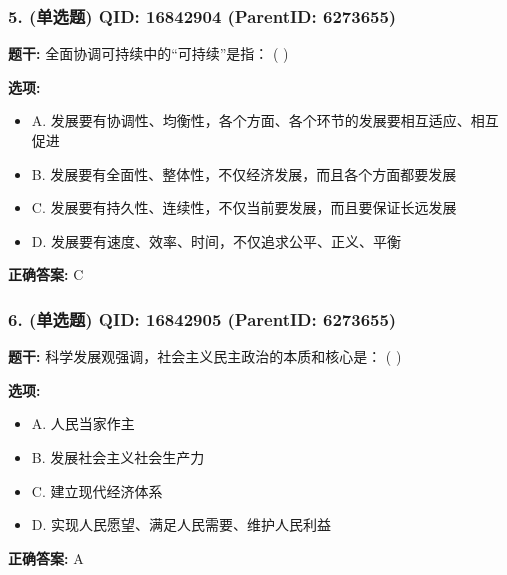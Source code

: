 \documentclass[12pt,UTF8]{ctexart}
\begin{document}
\subsubsection*{5. (单选题) \small QID: 16842904 (ParentID: 6273655)}

\textbf{题干:}
全面协调可持续中的“可持续”是指： ( )



\textbf{选项:}
\begin{itemize}[leftmargin=*]

  \item A. 发展要有协调性、均衡性，各个方面、各个环节的发展要相互适应、相互促进

  \item B. 发展要有全面性、整体性，不仅经济发展，而且各个方面都要发展

  \item C. 发展要有持久性、连续性，不仅当前要发展，而且要保证长远发展

  \item D. 发展要有速度、效率、时间，不仅追求公平、正义、平衡

\end{itemize}

\textbf{正确答案:}
C

\vspace{0.3em}\hrulefill\vspace{0.7em}

\subsubsection*{6. (单选题) \small QID: 16842905 (ParentID: 6273655)}

\textbf{题干:}
科学发展观强调，社会主义民主政治的本质和核心是： ( )



\textbf{选项:}
\begin{itemize}[leftmargin=*]

  \item A. 人民当家作主

  \item B. 发展社会主义社会生产力

  \item C. 建立现代经济体系

  \item D. 实现人民愿望、满足人民需要、维护人民利益

\end{itemize}

\textbf{正确答案:}
A
\end{document}
